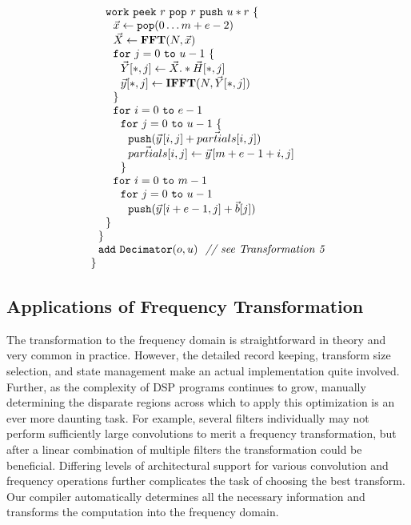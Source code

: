 \begin{transformation}
\begin{equation}
{\begin{array}{ll}
    \\
    ~~~~{\tt work}~{\tt peek}~r~{\tt pop}~r~{\tt push}~u*r~{\tt \{} \\
    ~~~~~~\vec{x} \leftarrow {\tt pop}(0 \dots m+e-2) \\
    ~~~~~~\vec{X} \leftarrow \mathbf{FFT} (N, \vec{x}) \\
    ~~~~~~{\tt for}~j=0~{\tt to}~u-1~{\tt \{}\\
    ~~~~~~~~\vec{Y}[*,j] \leftarrow \vec{X} .* \vec{H}[*,j] \\
    ~~~~~~~~\vec{y}[*,j] \leftarrow \mathbf{IFFT}(N, \vec{Y}[*,j]) \\
    ~~~~~~{\tt \}} \\
    ~~~~~~{\tt for}~i=0~{\tt to}~e-1\\
    ~~~~~~~~{\tt for}~j=0~{\tt to}~u-1~{\tt \{}\\
    ~~~~~~~~~~{\tt push}(\vec{y}\hspace{1pt}[i,j] + \vec{partials}[i,j])\\
    ~~~~~~~~~~\vec{partials}[i,j] \leftarrow \vec{y}\hspace{1pt}[m+e-1+i,j]\\
    ~~~~~~~~{\tt \}} \\
    ~~~~~~{\tt for}~i=0~{\tt to}~m-1\\
    ~~~~~~~~{\tt for}~j=0~{\tt to}~u-1\\
    ~~~~~~~~~~{\tt push}(\vec{y}\hspace{1pt}[i+e-1,j] + {\vec b}[j])\\
    ~~~~{\tt \}} \\
    ~~{\tt \}} \\
    ~~{\tt add~Decimator}(o, u)~~\mbox{\it // see Transformation 5}\\
    {\tt \}} \\
  \end{array}}
\end{equation}
\end{transformation}

\subsection{Applications of Frequency Transformation}

The transformation to the frequency domain is straightforward in
theory and very common in practice. However, the detailed record
keeping, transform size selection, and state management make an actual
implementation quite involved.  Further, as the complexity of DSP
programs continues to grow, manually determining the disparate regions
across which to apply this optimization is an ever more daunting task.
For example, several filters individually may not perform sufficiently
large convolutions to merit a frequency transformation, but after a
linear combination of multiple filters the transformation could be
beneficial.  Differing levels of architectural support for various
convolution and frequency operations further complicates the task of
choosing the best transform.  Our compiler automatically determines
all the necessary information and transforms the computation into the
frequency domain.

